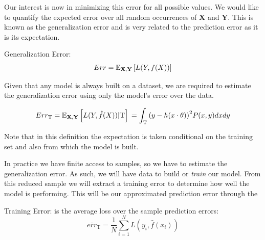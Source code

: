 Our interest is now in minimizing this error for all possible values. We would like to quantify the expected error over all random occurrences of $\textbf{X}$ and $\textbf{Y}$. This is known as the generalization error and is very related to the prediction error as it is its expectation.

\begin{definition}{Generalization Error:}
\begin{equation}
Err = \operatorname{\mathbb{E}}_{ \textbf{X}, \textbf{Y} } \left[ L(Y,f(X)) \right]
\end{equation}
\end{definition}

Given that any model is always built on a dataset, we are required to estimate the generalization error using only the model's error over the data.


\begin{equation}
	Err_{\mathrm{T}} = \operatorname{\mathbb{E}}_{\textbf{X},\textbf{Y}} \left[ L(Y,\hat{f}(X)) | \mathrm{T}\right] \\
	= \int_{\mathrm{T}} {(y - h(x \cdot \theta) )}^2 P(x,y)dxdy
\end{equation}


Note that in this definition the expectation is taken conditional on the training set and also from which the model is built.


In practice we have finite access to samples, so we have to estimate the generalization error. As such, we will have data to build or \textit{train} our model. From this reduced sample we will extract a training error to determine how well the model is performing. This will be our approximated prediction error through the
\begin{definition}{Training Error:}
	is the average loss over the sample prediction errors:
	$$ \overline{err}_{\mathrm{T}} = \frac{1}{N} \sum_{i=1}^N L(y_i, \hat{f}(x_i) )$$
\end{definition}\label{def:trainingError}

